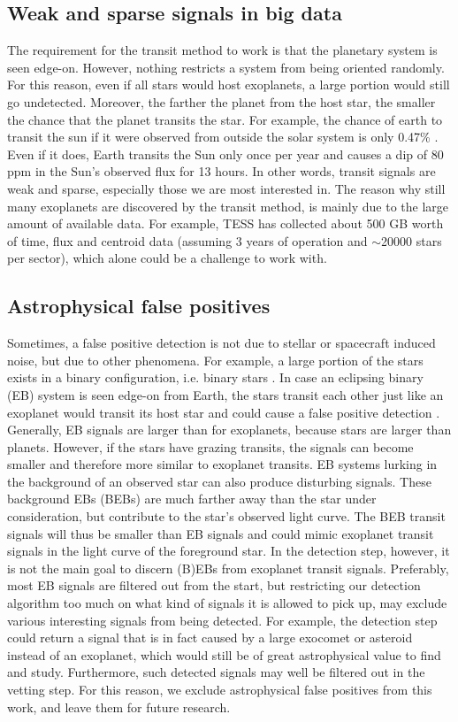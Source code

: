 \subsection{Weak and sparse signals in big data}

The requirement for the transit method to work is that the planetary system is seen edge-on. However, nothing restricts a system from being oriented randomly. For this reason, even if all stars would host exoplanets, a large portion would still go undetected. Moreover, the farther the planet from the host star, the smaller the chance that the planet transits the star. For example, the chance of earth to transit the sun if it were observed from outside the solar system is only 0.47\% \citep{borucki1984photometric}. Even if it does, Earth transits the Sun only once per year and causes a dip of 80 ppm in the Sun’s observed flux for 13 hours. In other words, transit signals are weak and sparse, especially those we are most interested in. The reason why still many exoplanets are discovered by the transit method, is mainly due to the large amount of available data. For example, TESS has collected about 500 GB worth of time, flux and centroid data (assuming 3 years of operation and $\sim$20000 stars per sector), which alone could be a challenge to work with.

\subsection{Astrophysical false positives}
\label{sec:astro_false_pos}

Sometimes, a false positive detection is not due to stellar or spacecraft induced noise, but due to other phenomena. For example, a large portion of the stars exists in a binary configuration, i.e. binary stars \citep{kirk2016kepler}. In case an eclipsing binary (EB) system is seen edge-on from Earth, the stars transit each other just like an exoplanet would transit its host star and could cause a false positive detection \cite{osborn2020rapid}. Generally, EB signals are larger than for exoplanets, because stars are larger than planets. However, if the stars have grazing transits, the signals can become smaller and therefore more similar to exoplanet transits. EB systems lurking in the background of an observed star can also produce disturbing signals. These background EBs (BEBs) are much farther away than the star under consideration, but contribute to the star's observed light curve. The BEB transit signals will thus be smaller than EB signals and could mimic exoplanet transit signals in the light curve of the foreground star. In the detection step, however, it is not the main goal to discern (B)EBs from exoplanet transit signals. Preferably, most EB signals are filtered out from the start, but restricting our detection algorithm too much on what kind of signals it is allowed to pick up, may exclude various interesting signals from being detected. For example, the detection step could return a signal that is in fact caused by a large exocomet or asteroid instead of an exoplanet, which would still be of great astrophysical value to find and study. Furthermore, such detected signals may well be filtered out in the vetting step. For this reason, we exclude astrophysical false positives from this work, and leave them for future research.